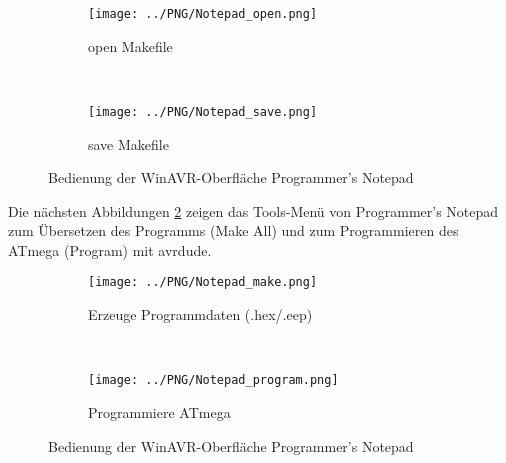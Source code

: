 \begin{figure}[H]
  \begin{subfigure}[b]{.5\textwidth}
    \centering
    \texttt{[image: ../PNG/Notepad\_open.png]}
    \caption{open Makefile}
  \end{subfigure}
  ~
  \begin{subfigure}[b]{.5\textwidth}
    \centering
    \texttt{[image: ../PNG/Notepad\_save.png]}
    \caption{save Makefile}
  \end{subfigure}
  \caption{Bedienung der WinAVR-Oberfläche Programmer's Notepad}
  \label{fig:WinAVR1}
\end{figure}
Die nächsten Abbildungen \ref{fig:WinAVR2} zeigen das Tools-Menü von Programmer's Notepad
zum Übersetzen des Programms (Make All) und zum Programmieren des ATmega (Program) mit avrdude.

\begin{figure}[H]
  \begin{subfigure}[b]{.5\textwidth}
    \centering
    \texttt{[image: ../PNG/Notepad\_make.png]}
    \caption{Erzeuge Programmdaten (.hex/.eep)}
  \end{subfigure}
  ~
  \begin{subfigure}[b]{.5\textwidth}
    \centering
    \texttt{[image: ../PNG/Notepad\_program.png]}
    \caption{Programmiere ATmega}
  \end{subfigure}
  \caption{Bedienung der WinAVR-Oberfläche Programmer's Notepad}
  \label{fig:WinAVR2}
\end{figure}

